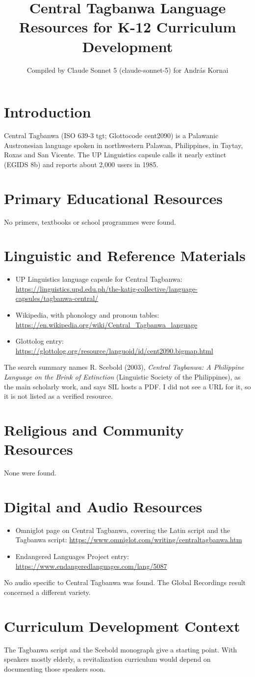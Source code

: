 \documentclass[12pt]{article}
\title{Central Tagbanwa Language Resources for K-12 Curriculum Development}
\author{Compiled by Claude Sonnet 5 (claude-sonnet-5) for Andr\'as Kornai}
\date{}
\begin{document}
\maketitle

\section{Introduction}
Central Tagbanwa (ISO 639-3 tgt; Glottocode cent2090) is a Palawanic Austronesian language spoken in northwestern Palawan, Philippines, in Taytay, Roxas and San Vicente. The UP Linguistics capsule calls it nearly extinct (EGIDS 8b) and reports about 2,000 users in 1985.

\section{Primary Educational Resources}
No primers, textbooks or school programmes were found.

\section{Linguistic and Reference Materials}
\begin{itemize}
\item UP Linguistics language capsule for Central Tagbanwa: \url{https://linguistics.upd.edu.ph/the-katig-collective/language-capsules/tagbanwa-central/}
\item Wikipedia, with phonology and pronoun tables: \url{https://en.wikipedia.org/wiki/Central_Tagbanwa_language}
\item Glottolog entry: \url{https://glottolog.org/resource/languoid/id/cent2090.bigmap.html}
\end{itemize}
The search summary names R. Scebold (2003), \emph{Central Tagbanwa: A Philippine Language on the Brink of Extinction} (Linguistic Society of the Philippines), as the main scholarly work, and says SIL hosts a PDF. I did not see a URL for it, so it is not listed as a verified resource.

\section{Religious and Community Resources}
None were found.

\section{Digital and Audio Resources}
\begin{itemize}
\item Omniglot page on Central Tagbanwa, covering the Latin script and the Tagbanwa script: \url{https://www.omniglot.com/writing/centraltagbanwa.htm}
\item Endangered Languages Project entry: \url{https://www.endangeredlanguages.com/lang/5087}
\end{itemize}
No audio specific to Central Tagbanwa was found. The Global Recordings result concerned a different variety.

\section{Curriculum Development Context}
The Tagbanwa script and the Scebold monograph give a starting point. With speakers mostly elderly, a revitalization curriculum would depend on documenting those speakers soon.
\end{document}
